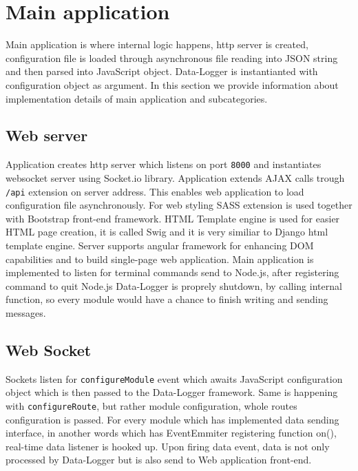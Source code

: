 \section{Main application} %
\label{sec:main_application}
Main application is where internal logic happens, http server is created, configuration file is loaded through asynchronous file reading into JSON string and then parsed into JavaScript object. Data-Logger is instantianted with configuration object as argument. In this section we provide information about implementation details of main application and subcategories. 
\subsection{Web server} %
\label{sub:web_server}
Application creates http server which listens on port \verb|8000| and instantiates websocket server using Socket.io library. Application extends AJAX calls trough \verb|/api| extension on server address.
This enables web application to load configuration file asynchronously. For web styling SASS extension is used together with Bootstrap front-end framework. HTML Template engine is used for easier HTML page creation, it is called Swig and it is very similiar to Django html template engine. Server supports angular framework for enhancing DOM capabilities and to build single-page web application. Main application is implemented to listen for terminal commands send to Node.js, after registering command to quit Node.js Data-Logger is proprely shutdown, by calling internal function, so every module would have a chance to finish writing and sending messages.%
\subsection{Web Socket} %
\label{sub:web_socket}
Sockets listen for \verb|configureModule| event which awaits JavaScript configuration object which is then passed to the Data-Logger framework. Same is happening with \verb|configureRoute|, but rather module configuration, whole routes configuration is passed. For every module which has implemented data sending interface, in another words which has EventEmmiter registering function on(), real-time data listener is hooked up. Upon firing data event, data is not only processed by Data-Logger but is also send to Web application front-end.
